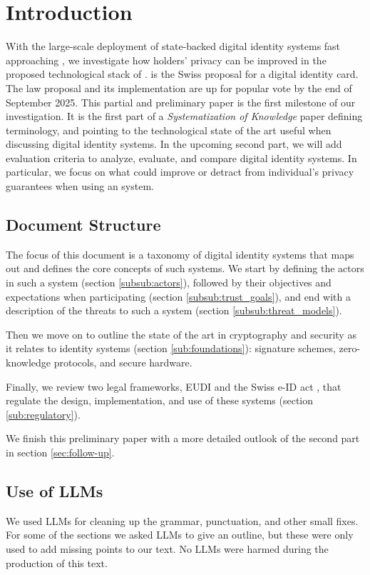 \section{Introduction}

With the large-scale deployment of state-backed digital identity systems fast approaching \cite{Swiyu} \cite{EUDI-ARF}, we investigate how holders' privacy can be improved in the proposed technological stack of \swiyu.
\swiyu is the Swiss proposal for a digital identity card.
The law proposal and its implementation are up for popular vote by the end of September 2025.
This partial and preliminary paper is the first milestone of our investigation. 
It is the first part of a \emph{Systematization of Knowledge} paper defining terminology, and pointing to the technological state of the art useful when discussing digital identity systems.
In the upcoming second part, we will add evaluation criteria to analyze, evaluate, and compare digital identity systems.
In particular, we focus on what could improve or detract from individual's privacy guarantees when using an \eid system.

\subsection{Document Structure}

The focus of this document is a taxonomy of digital identity systems that maps out and defines the core concepts of such systems.
We start by defining the actors in such a system (section \ref{subsub:actors}), followed by their objectives and expectations when participating (section \ref{subsub:trust_goals}), and end with a description of the threats to such a system (section \ref{subsub:threat_models}).

Then we move on to outline the state of the art in cryptography and security as it relates to identity systems (section \ref{sub:foundations}): signature schemes, zero-knowledge protocols, and secure hardware.

Finally, we review two legal frameworks, EUDI \cite{EUDI} and the Swiss e-ID act \cite{SwiyuAct25}, that regulate the design, implementation, and use of these systems (section \ref{sub:regulatory}).

We finish this preliminary paper with a more detailed outlook of the second part in section \ref{sec:follow-up}.

\subsection{Use of LLMs}

We used LLMs for cleaning up the grammar, punctuation, and other small fixes.
For some of the sections we asked LLMs to give an outline, but these were only used to add missing points to our text.
No LLMs were harmed during the production of this text.

